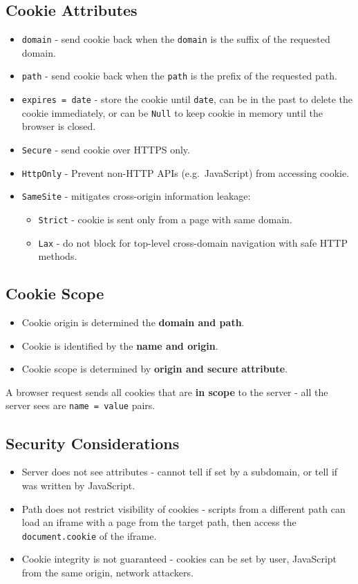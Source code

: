 \documentclass[11pt]{article}
\begin{document}
\subsection{Cookie Attributes}
\begin{itemize}
  \item \texttt{domain} - send cookie back when the \texttt{domain} is the suffix of the requested domain.
  \item \texttt{path} - send cookie back when the \texttt{path} is the prefix of the requested path.
  \item \texttt{expires = date} - store the cookie until \texttt{date}, can be in the past to delete the cookie immediately, or can be \texttt{Null} to keep cookie in memory until the browser is closed.
  \item \texttt{Secure} - send cookie over HTTPS only.
  \item \texttt{HttpOnly} - Prevent non-HTTP APIs (e.g.\ JavaScript) from accessing cookie.
  \item \texttt{SameSite} - mitigates cross-origin information leakage:
    \begin{itemize}
      \item \texttt{Strict} - cookie is sent only from a page with same domain.
      \item \texttt{Lax} - do not block for top-level cross-domain navigation with safe HTTP methods.
    \end{itemize}
\end{itemize}

\subsection{Cookie Scope}
\begin{itemize}
  \item Cookie origin is determined the \textbf{domain and path}.
  \item Cookie is identified by the \textbf{name and origin}.
  \item Cookie scope is determined by \textbf{origin and secure attribute}.
\end{itemize}
A browser request sends all cookies that are \textbf{in scope} to the server - all the server sees are \texttt{name = value} pairs.

\subsection{Security Considerations}
\begin{itemize}
  \item Server does not see attributes - cannot tell if set by a subdomain, or tell if was written by JavaScript.
  \item Path does not restrict visibility of cookies - scripts from a different path can load an iframe with a page from the target path, then access the \texttt{document.cookie} of the iframe.
  \item Cookie integrity is not guaranteed - cookies can be set by user, JavaScript from the same origin, network attackers.
\end{itemize}
\end{document}
